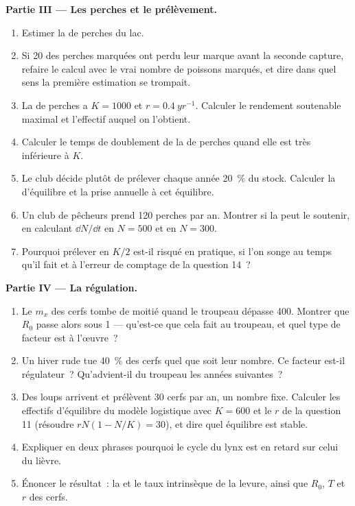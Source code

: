\begin{problem}
\medskip
\noindent\textbf{Partie III --- Les perches et le prélèvement.}
\begin{enumerate}[resume]
  \item Estimer la  de perches du lac.
  \item Si 20 des perches marquées ont perdu leur marque avant la
        seconde capture, refaire le calcul avec le vrai nombre de
        poissons marqués, et dire dans quel sens la première
        estimation se trompait.
  \item La  de perches a $K = 1000$ et $r = \qty{0.4}{yr^{-1}}$.
        Calculer le rendement soutenable maximal et l'effectif auquel
        on l'obtient.
  \item Calculer le temps de doublement de la  de perches
        quand elle est très inférieure à $K$.
  \item Le club décide plutôt de prélever chaque année \qty{20}{\%} du
        stock. Calculer la  d'équilibre et la prise annuelle
        à cet équilibre.
  \item Un club de pêcheurs prend 120 perches par an. Montrer si la
         peut le soutenir, en calculant $\dd N/\dd t$ en $N =
        500$ et en $N = 300$.
  \item Pourquoi prélever en $K/2$ est-il risqué en pratique, si l'on
        songe au temps qu'il fait et à l'erreur de comptage de la
        question 14~?
\end{enumerate}

\medskip
\noindent\textbf{Partie IV --- La régulation.}
\begin{enumerate}[resume]
  \item Le $m_x$ des cerfs tombe de moitié quand le troupeau dépasse
        400. Montrer que $R_0$ passe alors sous 1 --- qu'est-ce que cela
        fait au troupeau, et quel type de facteur est à l'œuvre~?
  \item Un hiver rude tue \qty{40}{\%} des cerfs quel que soit leur
        nombre. Ce facteur est-il régulateur~? Qu'advient-il du troupeau
        les années suivantes~?
  \item Des loups arrivent et prélèvent 30 cerfs par an, un nombre
        fixe. Calculer les effectifs d'équilibre du modèle logistique
        avec $K = 600$ et le $r$ de la question 11 (résoudre
        $rN(1 - N/K) = 30$), et dire quel équilibre est stable.
  \item Expliquer en deux phrases pourquoi le cycle du lynx est en
        retard sur celui du lièvre.
  \item Énoncer le résultat~: la  et le taux
        intrinsèque de la levure, ainsi que $R_0$, $T$ et $r$ des cerfs.
\end{enumerate}
\end{problem}
